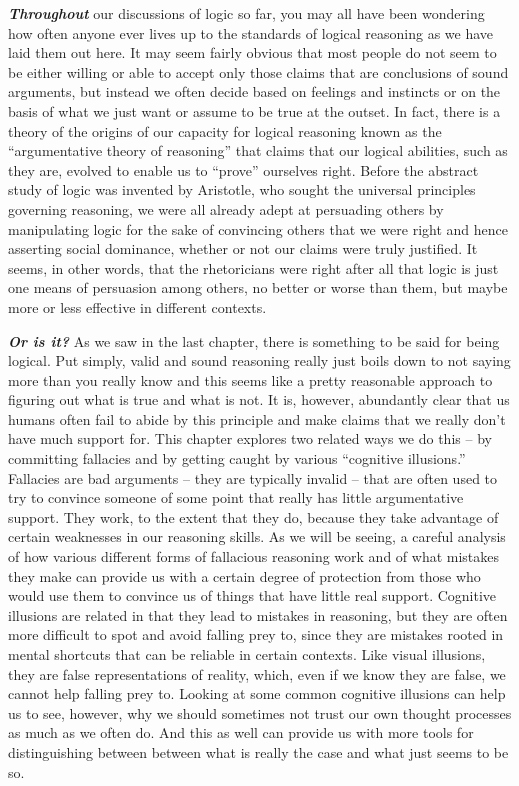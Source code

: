 \documentclass[]{book}
\begin{document}
\textbf{\emph{Throughout}} our discussions of logic so far, you may all have been wondering how often anyone ever lives up to the standards of logical reasoning as we have laid them out here. It may seem fairly obvious that most people do not seem to be either willing or able to accept only those claims that are conclusions of sound arguments, but instead we often decide based on feelings and instincts or on the basis of what we just want or assume to be true at the outset. In fact, there is a theory of the origins of our capacity for logical reasoning known as the ``argumentative theory of reasoning'' that claims that our logical abilities, such as they are, evolved to enable us to ``prove'' ourselves right. Before the abstract study of logic was invented by Aristotle, who sought the universal principles governing reasoning, we were all already adept at persuading others by manipulating logic for the sake of convincing others that we were right and hence asserting social dominance, whether or not our claims were truly justified. It seems, in other words, that the rhetoricians were right after all that logic is just one means of persuasion among others, no better or worse than them, but maybe more or less effective in different contexts.

\textbf{\emph{Or is it?}} As we saw in the last chapter, there is something to be said for being logical. Put simply, valid and sound reasoning really just boils down to not saying more than you really know and this seems like a pretty reasonable approach to figuring out what is true and what is not. It is, however, abundantly clear that us humans often fail to abide by this principle and make claims that we really don't have much support for. This chapter explores two related ways we do this -- by committing fallacies and by getting caught by various ``cognitive illusions.'' Fallacies are bad arguments -- they are typically invalid -- that are often used to try to convince someone of some point that really has little argumentative support. They work, to the extent that they do, because they take advantage of certain weaknesses in our reasoning skills. As we will be seeing, a careful analysis of how various different forms of fallacious reasoning work and of what mistakes they make can provide us with a certain degree of protection from those who would use them to convince us of things that have little real support. Cognitive illusions are related in that they lead to mistakes in reasoning, but they are often more difficult to spot and avoid falling prey to, since they are mistakes rooted in mental shortcuts that can be reliable in certain contexts. Like visual illusions, they are false representations of reality, which, even if we know they are false, we cannot help falling prey to. Looking at some common cognitive illusions can help us to see, however, why we should sometimes not trust our own thought processes as much as we often do. And this as well can provide us with more tools for distinguishing between between what is really the case and what just seems to be so.
\end{document}
